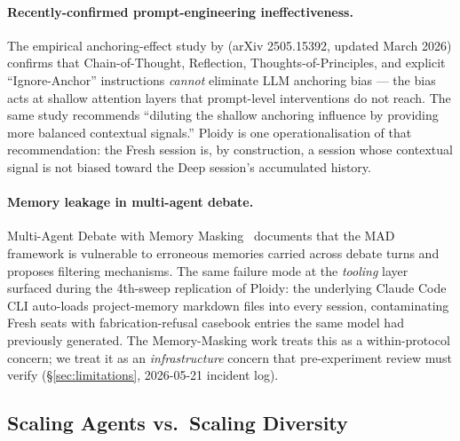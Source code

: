 \documentclass[11pt]{article}
\begin{document}
\paragraph{Recently-confirmed prompt-engineering ineffectiveness.} The empirical anchoring-effect study by \citet{anchoring2026synthetic} (arXiv 2505.15392, updated March 2026) confirms that Chain-of-Thought, Reflection, Thoughts-of-Principles, and explicit ``Ignore-Anchor'' instructions \emph{cannot} eliminate LLM anchoring bias --- the bias acts at shallow attention layers that prompt-level interventions do not reach. The same study recommends ``diluting the shallow anchoring influence by providing more balanced contextual signals.'' Ploidy is one operationalisation of that recommendation: the Fresh session is, by construction, a session whose contextual signal is not biased toward the Deep session's accumulated history.

\paragraph{Memory leakage in multi-agent debate.} Multi-Agent Debate with Memory Masking~\citep{mad2026memorymasking} documents that the MAD framework is vulnerable to erroneous memories carried across debate turns and proposes filtering mechanisms. The same failure mode at the \emph{tooling} layer surfaced during the 4th-sweep replication of Ploidy: the underlying Claude Code CLI auto-loads project-memory markdown files into every session, contaminating Fresh seats with fabrication-refusal casebook entries the same model had previously generated. The Memory-Masking work treats this as a within-protocol concern; we treat it as an \emph{infrastructure} concern that pre-experiment review must verify (\S\ref{sec:limitations}, 2026-05-21 incident log).

\subsection{Scaling Agents vs.\ Scaling Diversity}
\label{sec:scaling}
\end{document}

